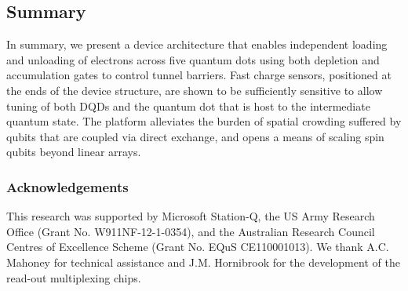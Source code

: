 \subsection{Summary}
In summary, we present a device architecture that enables independent loading and unloading of electrons across five quantum dots using both depletion and accumulation gates to control tunnel barriers. Fast charge sensors, positioned at the ends of the device structure, are shown to be sufficiently sensitive to allow tuning of both DQDs and the quantum dot that is host to the intermediate quantum state. The platform alleviates the burden of spatial crowding suffered by qubits that are coupled via direct exchange, and opens a means of scaling spin qubits beyond linear arrays. 

\subsubsection{Acknowledgements}
This research was supported by Microsoft Station-Q, the US Army Research Office (Grant No. W911NF-12-1-0354), and the Australian Research Council Centres of Excellence Scheme (Grant No. EQuS CE110001013). We thank A.C. Mahoney for technical assistance and J.M. Hornibrook for the development of the read-out multiplexing chips.

